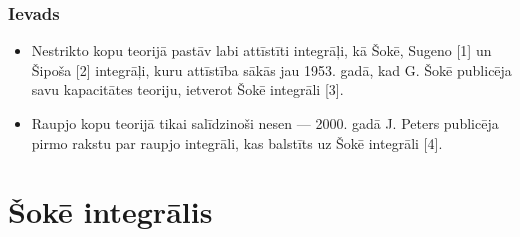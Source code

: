 \documentclass{beamer}
\theoremstyle{definition}
\begin{document}
\begin{frame}
\frametitle{Ievads}
\begin{itemize}
\setlength\itemsep{1em}
\item Nestrikto kopu teorijā pastāv labi
attīstīti integrāļi, kā Šokē, Sugeno [1] un Šipoša [2] integrāļi, kuru attīstība sākās jau 1953.
gadā, kad G. Šokē publicēja savu kapacitātes teoriju, ietverot Šokē integrāli [3]. 
\item Raupjo
kopu teorijā tikai salīdzinoši nesen — 2000. gadā J. Peters publicēja pirmo rakstu par
raupjo integrāli, kas balstīts uz Šokē integrāli [4].
\end{itemize}
\end{frame}

\section{Šokē integrālis}
\end{document}
